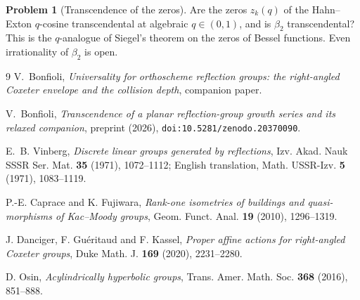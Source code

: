 \documentclass[11pt]{article}
\theoremstyle{definition}
\newtheorem{problem}[theorem]{Problem}
\theoremstyle{remark}
\theoremstyle{definition}
\begin{document}
\begin{problem}[Transcendence of the zeros]\label{prob:zeros}
Are the zeros $z_k(q)$ of the Hahn--Exton $q$-cosine transcendental at algebraic $q\in(0,1)$, and
is $\beta_2$ transcendental? This is the $q$-analogue of Siegel's theorem on the zeros of Bessel
functions. Even irrationality of $\beta_2$ is open.
\end{problem}

\begin{thebibliography}{9}
V.~Bonfioli, \emph{Universality for orthoscheme reflection groups: the right-angled Coxeter
envelope and the collision depth}, companion paper.

V.~Bonfioli, \emph{Transcendence of a planar reflection-group growth series and its relaxed
companion}, preprint (2026), \texttt{doi:10.5281/zenodo.20370090}.

E.~B. Vinberg,
\emph{Discrete linear groups generated by reflections},
Izv. Akad. Nauk SSSR Ser. Mat. \textbf{35} (1971), 1072--1112;
English translation, Math. USSR-Izv. \textbf{5} (1971), 1083--1119.

P.-E. Caprace and K. Fujiwara,
\emph{Rank-one isometries of buildings and quasi-morphisms of Kac--Moody groups},
Geom. Funct. Anal. \textbf{19} (2010), 1296--1319.

J. Danciger, F. Gu\'eritaud and F. Kassel,
\emph{Proper affine actions for right-angled Coxeter groups},
Duke Math. J. \textbf{169} (2020), 2231--2280.

D. Osin,
\emph{Acylindrically hyperbolic groups},
Trans. Amer. Math. Soc. \textbf{368} (2016), 851--888.
\end{thebibliography}
\end{document}
